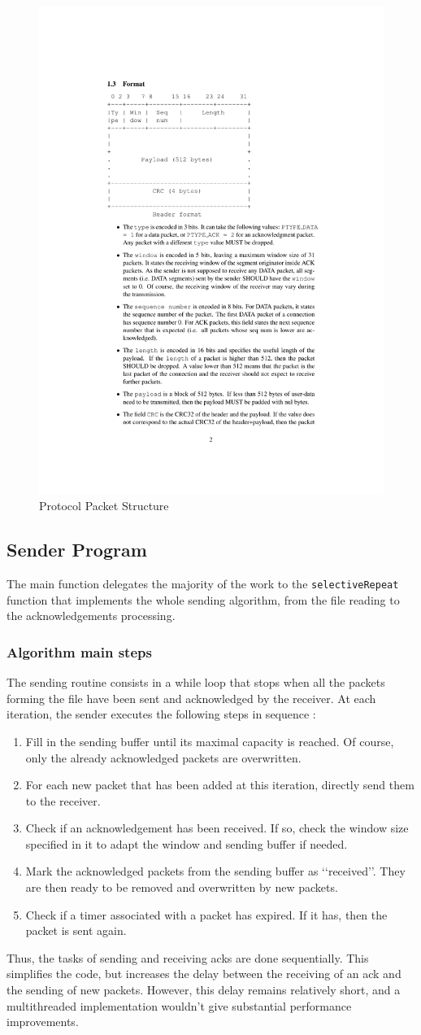 \documentclass[11pt,a4paper,titlepage]{article}
\begin{document}
\begin{figure}[!ht]
	\centering
	\includegraphics[width=.5\textwidth]{figure/packet_header.pdf}
	\caption{\label{fig:struct} Protocol Packet Structure}
\end{figure}

\subsection{Sender Program}

The main function delegates the majority of the work to the \texttt{selectiveRepeat} function that implements the whole sending algorithm, from the file reading to the acknowledgements processing. 

\subsubsection{Algorithm main steps}
The sending routine consists in a while loop that stops when all the packets forming the file have been sent and acknowledged by the receiver. At each iteration, the sender executes the following steps in sequence :
\begin{enumerate}
\item Fill in the sending buffer until its maximal capacity is reached. Of course, only the already acknowledged packets are overwritten.
%
\item For each new packet that has been added at this iteration, directly send them to the receiver.
%
\item Check if an acknowledgement has been received. If so, check the window size specified in it to adapt the window and sending buffer if needed. 
%
\item Mark the acknowledged packets from the sending buffer as ‘‘received’’. They are then ready to be removed and overwritten by new packets.
%
\item Check if a timer associated with a packet has expired. If it has, then the packet is sent again.
\end{enumerate}
Thus, the tasks of sending and receiving acks are done sequentially. This simplifies the code, but increases the delay between the receiving of an ack and the sending of new packets. However, this delay remains relatively short, and a multithreaded implementation wouldn't give substantial performance improvements. 
\end{document}
